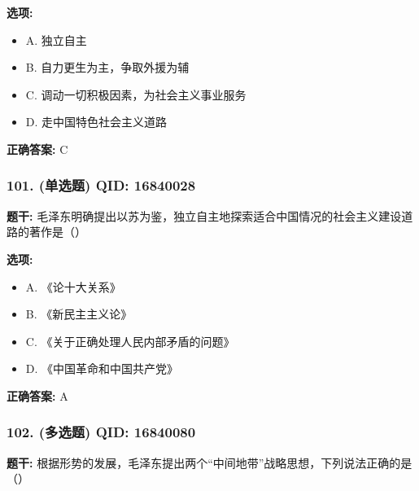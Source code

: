 \documentclass[12pt,UTF8]{ctexart}
\begin{document}
\textbf{选项:}
\begin{itemize}[leftmargin=*]

  \item A. 独立自主

  \item B. 自力更生为主，争取外援为辅

  \item C. 调动一切积极因素，为社会主义事业服务

  \item D. 走中国特色社会主义道路

\end{itemize}

\textbf{正确答案:}
C

\vspace{0.3em}\hrulefill\vspace{0.7em}

\subsubsection*{101. (单选题) \small QID: 16840028}

\textbf{题干:}
毛泽东明确提出以苏为鉴，独立自主地探索适合中国情况的社会主义建设道路的著作是（）

\textbf{选项:}
\begin{itemize}[leftmargin=*]

  \item A. 《论十大关系》

  \item B. 《新民主主义论》

  \item C. 《关于正确处理人民内部矛盾的问题》

  \item D. 《中国革命和中国共产党》

\end{itemize}

\textbf{正确答案:}
A

\vspace{0.3em}\hrulefill\vspace{0.7em}

\subsubsection*{102. (多选题) \small QID: 16840080}

\textbf{题干:}
根据形势的发展，毛泽东提出两个“中间地带”战略思想，下列说法正确的是（）
\end{document}
